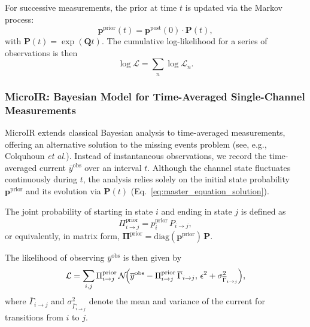 \documentclass[pdflatex,sn-nature]{sn-jnl}%
\theoremstyle{thmstyleone}%
\theoremstyle{thmstyletwo}%
\theoremstyle{thmstylethree}%
\begin{document}
For successive measurements, the prior at time \(t\) is updated via the Markov process:
\begin{equation}
	\boldsymbol{p}^{\text{prior}}(t) = \boldsymbol{p}^{\text{post}}(0) \cdot \boldsymbol{P}(t),
	\label{eq:prior_update_short}
\end{equation}
with \(\boldsymbol{P}(t)=\exp(\boldsymbol{Q}t)\). The cumulative log-likelihood for a series of observations is then
\begin{equation}
	\log \mathcal{L} = \sum_n \log \mathcal{L}_n.
	\label{eq:total_loglikelihood_short}
\end{equation}


\subsubsection{MicroIR: Bayesian Model for Time-Averaged Single-Channel Measurements}

MicroIR extends classical Bayesian analysis to time-averaged measurements, offering an alternative solution to the missing events problem (see, e.g., Colquhoun \textit{et al.}). Instead of instantaneous observations, we record the time-averaged current \(\overline{y}^{\text{obs}}\) over an interval \(t\). Although the channel state fluctuates continuously during \(t\), the analysis relies solely on the initial state probability \(\boldsymbol{p}^{\text{prior}}\) and its evolution via \(\mathbf{P}(t)\) (Eq.~\ref{eq:master_equation_solution}).

The joint probability of starting in state \(i\) and ending in state \(j\) is defined as
\begin{equation}
	\Pi_{i\rightarrow j}^{\text{prior}} = p_i^{\text{prior}}\,P_{i\rightarrow j},
	\label{eq:joint_state_probability_short}
\end{equation}
or equivalently, in matrix form, \(\boldsymbol{\Pi}^{\text{prior}} = \mathrm{diag}(\boldsymbol{p}^{\text{prior}})\,\mathbf{P}\).

The likelihood of observing \(\overline{y}^{\text{obs}}\) is then given by
\begin{equation}
	\mathcal{L} = \sum_{i,j} \Pi_{i\rightarrow j}^{\text{prior}}\,\mathcal{N}\!\Bigl(\overline{y}^{\text{obs}} - \Pi_{i\rightarrow j}^{\text{prior}}\,\overline{\Gamma}_{i\rightarrow j},\, \epsilon^2 + \sigma^2_{\overline{\Gamma}_{i\rightarrow j}}\Bigr),
	\label{eq:integrated_likelihood_short}
\end{equation}
where \(\overline{\Gamma}_{i\rightarrow j}\) and \(\sigma^2_{\overline{\Gamma}_{i\rightarrow j}}\) denote the mean and variance of the current for transitions from \(i\) to \(j\).
\end{document}
